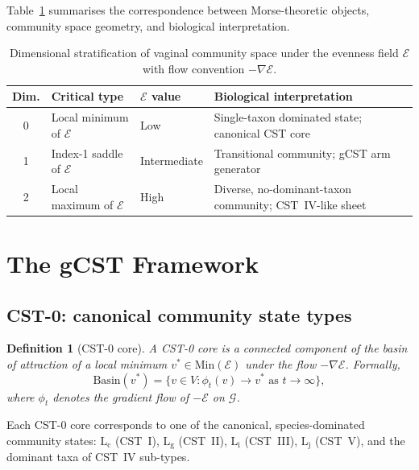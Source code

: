 \documentclass[11pt]{article}
\theoremstyle{plain}
\newtheorem{definition}{Definition}[section]
\newcommand{\E}{\mathcal{E}}
\newcommand{\G}{\mathcal{G}}
\newcommand{\Min}{\mathrm{Min}}
\newcommand{\Li}{\mathrm{L}_\mathrm{i}}
\newcommand{\Lc}{\mathrm{L}_\mathrm{c}}
\newcommand{\Lg}{\mathrm{L}_\mathrm{g}}
\begin{document}
Table~\ref{tab:hierarchy} summarises the correspondence between Morse-theoretic
objects, community space geometry, and biological interpretation.

\begin{table}[h]
  \centering
  \renewcommand{\arraystretch}{1.4}
  \begin{tabular}{clll}
    \toprule
    \textbf{Dim.} & \textbf{Critical type} & \textbf{$\E$ value} &
    \textbf{Biological interpretation} \\
    \midrule
    0 & Local minimum of $\E$ & Low  &
      Single-taxon dominated state; canonical CST core \\
    1 & Index-1 saddle of $\E$ & Intermediate &
      Transitional community; gCST arm generator \\
    2 & Local maximum of $\E$ & High &
      Diverse, no-dominant-taxon community; CST~IV-like sheet \\
    \bottomrule
  \end{tabular}
  \caption{Dimensional stratification of vaginal community space under the
    evenness field $\E$ with flow convention $-\nabla\E$.}
  \label{tab:hierarchy}
\end{table}

\section{The gCST Framework}
\label{sec:gcst}

\subsection{CST-0: canonical community state types}
\label{sec:cst0}

\begin{definition}[CST-0 core]
  A \emph{CST-0 core} is a connected component of the basin of attraction of a
  local minimum $v^* \in \Min(\E)$ under the flow $-\nabla\E$.  Formally,
  \[
    \mathrm{Basin}(v^*) =
      \{v \in V : \phi_t(v) \to v^* \text{ as } t \to \infty\},
  \]
  where $\phi_t$ denotes the gradient flow of $-\E$ on $\G$.
\end{definition}

Each CST-0 core corresponds to one of the canonical, species-dominated
community states: $\Lc$ (CST~I), $\Lg$ (CST~II), $\Li$ (CST~III),
$\mathrm{L_j}$ (CST~V), and the dominant taxa of CST~IV sub-types.
\end{document}
